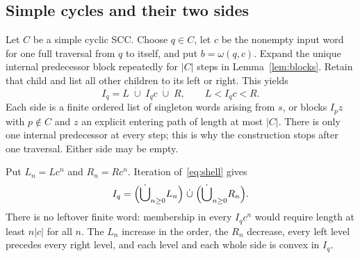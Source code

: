 \documentclass[acmsmall,screen,nonacm,11pt]{acmart}
\theoremstyle{definition}
\begin{document}
\subsection{Simple cycles and their two sides}

Let $C$ be a simple cyclic SCC. Choose $q\in C$, let $c$ be the nonempty
input word for one full traversal from $q$ to itself, and put
$b=\omega(q,c)$. Expand the unique internal predecessor block repeatedly
for $|C|$ steps in Lemma~\ref{lem:blocks}. Retain that child and list all
other children to its left or right. This yields
\begin{equation}\label{eq:shell}
 I_q=L\;\dot\cup\;I_qc\;\dot\cup\;R,\qquad L<I_qc<R.
\end{equation}
Each side is a finite ordered list of singleton words arising from $s$, or
blocks $I_pz$ with $p\notin C$ and $z$ an explicit entering path of length
at most $|C|$. There is only one internal predecessor at every step; this
is why the construction stops after one traversal. Either side may be empty.

Put $L_n=Lc^n$ and $R_n=Rc^n$. Iteration of~\eqref{eq:shell} gives
\begin{equation}\label{eq:levels}
 I_q=\Bigl(\dot\bigcup_{n\geq0}L_n\Bigr)
       \;\dot\cup\;
       \Bigl(\dot\bigcup_{n\geq0}R_n\Bigr).
\end{equation}
There is no leftover finite word: membership in every $I_qc^n$ would require
length at least $n|c|$ for all $n$. The $L_n$ increase in the order, the
$R_n$ decrease, every left level precedes every right level, and each level
and each whole side is convex in $I_q$.
\end{document}
